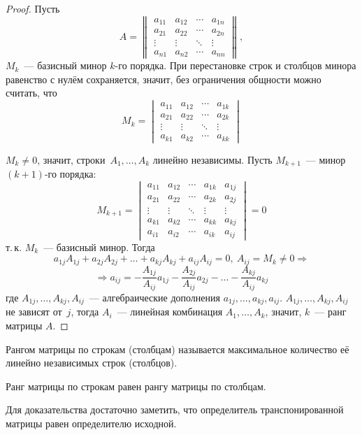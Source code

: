 \begin{proof}
Пусть
\begin{equation*}
A =
\begin{Vmatrix}
a_{11} & a_{12} & \cdots & a_{1n} \\
a_{21} & a_{22} & \cdots & a_{2n} \\
\vdots & \vdots & \ddots & \vdots \\
a_{n1} & a_{n2} & \cdots & a_{nn}
\end{Vmatrix},
\end{equation*}
$M_k$~--- базисный минор $k$\nobreakdash-го порядка.
При перестановке строк и столбцов минора равенство с нулём сохраняется, значит, без ограничения общности можно считать, что
\begin{equation*}
M_k =
\begin{vmatrix}
a_{11} & a_{12} & \cdots & a_{1k} \\
a_{21} & a_{22} & \cdots & a_{2k} \\
\vdots & \vdots & \ddots & \vdots \\
a_{k1} & a_{k2} & \cdots & a_{kk}
\end{vmatrix}
\end{equation*}

$M_k \neq 0$, значит, строки~$A_1, \ldots, A_k$ линейно независимы. Пусть $M_{k+1}$~--- минор $(k + 1)$\nobreakdash-го порядка:
\begin{equation*}
M_{k+1} =
\begin{vmatrix}
a_{11} & a_{12} & \cdots & a_{1k} & a_{1j} \\
a_{21} & a_{22} & \cdots & a_{2k} & a_{2j} \\
\vdots & \vdots & \ddots & \vdots & \vdots \\
a_{k1} & a_{k2} & \cdots & a_{kk} & a_{kj} \\
a_{i1} & a_{i2} & \cdots & a_{ik} & a_{ij}
\end{vmatrix} = 0
\end{equation*}
т.\,к. $M_k$~--- базисный минор.
Тогда
\begin{equation*}
a_{1j} A_{1j} + a_{2j} A_{2j} + \ldots + a_{kj} A_{kj} + a_{ij} A_{ij} = 0, \ A_{ij} = M_k \neq 0 \Rightarrow
\end{equation*}
\begin{equation*}
\Rightarrow a_{ij} = -\frac{A_{1j}}{A_{ij}} a_{1j} - \frac{A_{2j}}{A_{ij}} a_{2j} - \ldots - \frac{A_{kj}}{A_{ij}} a_{kj}
\end{equation*}
где $A_{1j}, \ldots, A_{kj}, A_{ij}$~--- алгебраические дополнения $a_{1j}, \ldots, a_{kj}, a_{ij}$.
$A_{1j}, \ldots, A_{kj}, A_{ij}$ не зависят от~$j$, тогда $A_i$~--- линейная комбинация $A_1, \ldots, A_k$, значит, $k$~--- ранг матрицы $A$.
\end{proof}

Рангом матрицы по строкам (столбцам) называется максимальное количество её линейно независимых строк (столбцов).

\begin{consequent}
Ранг матрицы по строкам равен рангу матрицы по столбцам.
\end{consequent}%
Для доказательства достаточно заметить, что определитель транспонированной матрицы равен определителю исходной.